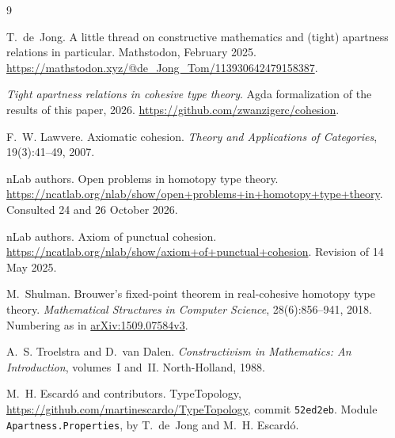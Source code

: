 \documentclass[11pt]{amsart}
\theoremstyle{definition}
\theoremstyle{remark}
\newcommand{\ag}[1]{\texttt{#1}}
\begin{document}
\begin{thebibliography}{9}
\setlength{\itemsep}{0pt}

T.~de~Jong.
\newblock A little thread on constructive mathematics and (tight)
  apartness relations in particular.
\newblock Mathstodon, February 2025.
\newblock \url{https://mathstodon.xyz/@de_Jong_Tom/113930642479158387}.

\emph{Tight apartness relations in cohesive type theory}.
\newblock Agda formalization of the results of this paper, 2026.
\newblock \url{https://github.com/zwanzigerc/cohesion}.

F.~W. Lawvere.
\newblock Axiomatic cohesion.
\newblock \emph{Theory and Applications of Categories}, 19(3):41--49,
  2007.

nLab authors.
\newblock Open problems in homotopy type theory.
\newblock
  \url{https://ncatlab.org/nlab/show/open+problems+in+homotopy+type+theory}.
\newblock Consulted 24 and 26 October 2026.

nLab authors.
\newblock Axiom of punctual cohesion.
\newblock
  \url{https://ncatlab.org/nlab/show/axiom+of+punctual+cohesion}.
\newblock Revision of 14 May 2025.

M.~Shulman.
\newblock Brouwer's fixed-point theorem in real-cohesive homotopy type
  theory.
\newblock \emph{Mathematical Structures in Computer Science},
  28(6):856--941, 2018.
\newblock Numbering as in
  \href{https://arxiv.org/abs/1509.07584v3}{arXiv:1509.07584v3}.

A.~S. Troelstra and D.~van Dalen.
\newblock \emph{Constructivism in Mathematics: An Introduction}, volumes~I
  and~II.
\newblock North-Holland, 1988.

M.~H. Escard\'o and contributors.
\newblock TypeTopology, \url{https://github.com/martinescardo/TypeTopology},
  commit \ag{52ed2eb}.
\newblock Module \ag{Apartness.Properties}, by T.~de~Jong and
  M.~H. Escard\'o.

\end{thebibliography}
\end{document}
